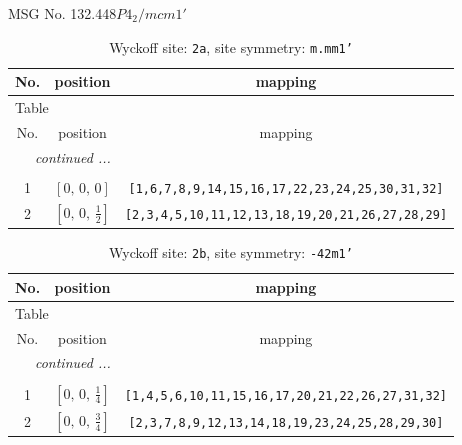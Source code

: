 \documentclass[fleqn,8pt]{jsarticle}
\begin{document}
\setcounter{MaxMatrixCols}{32}

\renewcommand{\tablename}{Table~}
\renewcommand{\figurename}{Figure~}
\begin{center}
\LARGE
MSG No. 132.448\quad$P4_{2}/mcm1'$
\end{center}
\renewcommand{\arraystretch}{1.2}
\begin{longtable}{ccc}
\caption{Wyckoff site: {\tt 2a}, site symmetry: {\tt m.mm1'}}
 \\
 \hline \hline
No. & position & mapping \\ \hline \endfirsthead

\multicolumn{2}{l}{\tablename\ \thetable{}} \\
 \hline \hline
No. & position & mapping \\ \hline \endhead

 \hline \hline
\multicolumn{2}{r}{\footnotesize\it continued ...} \\ \endfoot

 \hline \hline
\multicolumn{2}{r}{} \\ \endlastfoot

1 & $\left[ 0,\, 0,\, 0 \right]$ & {\tt [1,6,7,8,9,14,15,16,17,22,23,24,25,30,31,32]} \\ \hline
2 & $\left[ 0,\, 0,\, \frac{1}{2} \right]$ & {\tt [2,3,4,5,10,11,12,13,18,19,20,21,26,27,28,29]} \\
\end{longtable}
\renewcommand{\arraystretch}{1.2}
\begin{longtable}{ccc}
\caption{Wyckoff site: {\tt 2b}, site symmetry: {\tt -42m1'}}
 \\
 \hline \hline
No. & position & mapping \\ \hline \endfirsthead

\multicolumn{2}{l}{\tablename\ \thetable{}} \\
 \hline \hline
No. & position & mapping \\ \hline \endhead

 \hline \hline
\multicolumn{2}{r}{\footnotesize\it continued ...} \\ \endfoot

 \hline \hline
\multicolumn{2}{r}{} \\ \endlastfoot

1 & $\left[ 0,\, 0,\, \frac{1}{4} \right]$ & {\tt [1,4,5,6,10,11,15,16,17,20,21,22,26,27,31,32]} \\ \hline
2 & $\left[ 0,\, 0,\, \frac{3}{4} \right]$ & {\tt [2,3,7,8,9,12,13,14,18,19,23,24,25,28,29,30]} \\
\end{longtable}
\end{document}

